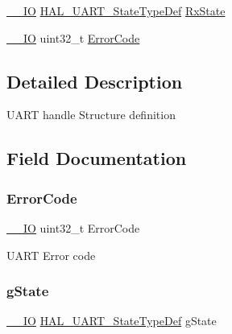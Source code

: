\begin{DoxyCompactItemize}
\item 
\mbox{\hyperlink{core__sc300_8h_aec43007d9998a0a0e01faede4133d6be}{\+\_\+\+\_\+\+IO}} \mbox{\hyperlink{group___u_a_r_t___exported___types_gaf55d844a35379c204c90be5d1e8e50ba}{H\+A\+L\+\_\+\+U\+A\+R\+T\+\_\+\+State\+Type\+Def}} \mbox{\hyperlink{struct_u_a_r_t___handle_type_def_a198c30da19a1529e1665bec6dc455815}{Rx\+State}}
\item 
\mbox{\hyperlink{core__sc300_8h_aec43007d9998a0a0e01faede4133d6be}{\+\_\+\+\_\+\+IO}} uint32\+\_\+t \mbox{\hyperlink{struct_u_a_r_t___handle_type_def_a123c5063e6a3b1901b2fbe5f88c53a7e}{Error\+Code}}
\end{DoxyCompactItemize}


\subsection{Detailed Description}
U\+A\+RT handle Structure definition ~\newline
 

\subsection{Field Documentation}
\mbox{\label{struct_u_a_r_t___handle_type_def_a123c5063e6a3b1901b2fbe5f88c53a7e}} 
\subsubsection{\texorpdfstring{Error\+Code}{ErrorCode}}
{\footnotesize\ttfamily \mbox{\hyperlink{core__sc300_8h_aec43007d9998a0a0e01faede4133d6be}{\+\_\+\+\_\+\+IO}} uint32\+\_\+t Error\+Code}

U\+A\+RT Error code \mbox{\label{struct_u_a_r_t___handle_type_def_ab596705b6ce037e8debc149ccee148da}} 
\subsubsection{\texorpdfstring{g\+State}{gState}}
{\footnotesize\ttfamily \mbox{\hyperlink{core__sc300_8h_aec43007d9998a0a0e01faede4133d6be}{\+\_\+\+\_\+\+IO}} \mbox{\hyperlink{group___u_a_r_t___exported___types_gaf55d844a35379c204c90be5d1e8e50ba}{H\+A\+L\+\_\+\+U\+A\+R\+T\+\_\+\+State\+Type\+Def}} g\+State}

